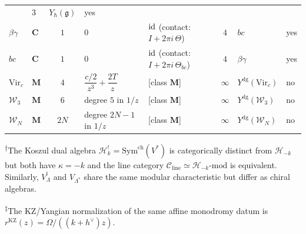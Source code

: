 \begin{theorem}
\begin{center}
\begin{tabular}{llcllcll}
 & $3$
 & $Y_\hbar(\mathfrak{g})$
 & yes \\[3pt]
$\beta\gamma$
 & $\mathbf{C}$ & $1$
 & $0$
 & $\mathrm{id}$ \textup{(contact: }$I + 2\pi i\,\Theta$\textup{)}
 & $4$
 & $bc$
 & yes \\[3pt]
$bc$
 & $\mathbf{C}$ & $1$
 & $0$
 & $\mathrm{id}$ \textup{(contact: }$I + 2\pi i\,\Theta_{bc}$\textup{)}
 & $4$
 & $\beta\gamma$
 & yes \\[3pt]
$\mathrm{Vir}_c$
 & $\mathbf{M}$ & $4$
 & $\dfrac{c/2}{z^3} + \dfrac{2T}{z}$
 & \textup{[class $\mathbf{M}$]}
 & $\infty$
 & $Y^{\mathrm{dg}}(\mathrm{Vir}_c)$
 & no \\[6pt]
$\mathcal{W}_3$
 & $\mathbf{M}$ & $6$
 & degree $5$ in $1/z$
 & \textup{[class $\mathbf{M}$]}
 & $\infty$
 & $Y^{\mathrm{dg}}(\mathcal{W}_3)$
 & no \\[3pt]
$\mathcal{W}_N$
 & $\mathbf{M}$ & $2N$
 & degree $2N{-}1$ in $1/z$
 & \textup{[class $\mathbf{M}$]}
 & $\infty$
 & $Y^{\mathrm{dg}}(\mathcal{W}_N)$
 & no \\
\bottomrule
\end{tabular}
\end{center}

\smallskip
\noindent
\textsuperscript{$\dagger$}The Koszul dual algebra $\mathcal{H}_k^!
= \mathrm{Sym}^{\mathrm{ch}}(V^*)$ is categorically distinct from
$\mathcal{H}_{-k}$ but
both have $\kappa = -k$ and the line category
$\mathcal{C}_{\mathrm{line}} \simeq
\mathcal{H}_{-k}\text{-}\mathrm{mod}$
is equivalent. Similarly, $V_\Lambda^!$ and $V_{\Lambda^*}$ share
the same modular characteristic but differ as chiral algebras.

\textsuperscript{$\ddagger$}The KZ/Yangian normalization of the same
affine monodromy datum is
$r^{\mathrm{KZ}}(z)=\Omega/((k+h^\vee)z)$.
\end{theorem}

